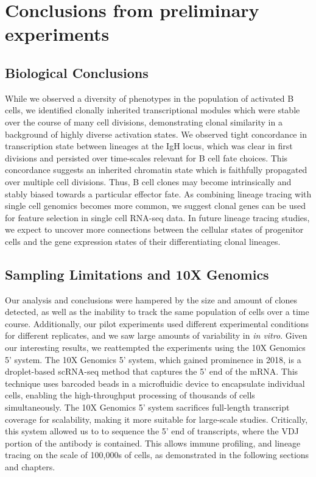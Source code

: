 \section{Conclusions from preliminary experiments}

\subsection{Biological Conclusions}
While we observed a diversity of phenotypes in the population of activated B cells, we identified clonally inherited transcriptional modules which were stable over the course of many cell divisions, demonstrating clonal similarity in a background of highly diverse activation states. We observed tight concordance in transcription state between lineages at the IgH locus, which was clear in first divisions and persisted over time-scales relevant for B cell fate choices\cite{hodgkin_modifying_2018}. This concordance suggests an inherited chromatin state which is faithfully propagated over multiple cell divisions. Thus, B cell clones may become intrinsically and stably biased towards a particular effector fate. As combining lineage tracing with single cell genomics becomes more common, we suggest clonal genes can be used for feature selection in single cell RNA-seq data. In future lineage tracing studies, we expect to uncover more connections between the cellular states of progenitor cells and the gene expression states of their differentiating clonal lineages.

\subsection{Sampling Limitations and 10X Genomics}
Our analysis and conclusions were hampered by the size and amount of clones detected, as well as the inability to track the same population of cells over a time course. Additionally, our pilot experiments used different experimental conditions for different replicates, and we saw large amounts of variability in \textit{in vitro}. Given our interesting results, we reattempted the experiments using the 10X Genomics 5' system. The 10X Genomics 5' system, which gained prominence in 2018, is a droplet-based scRNA-seq method that captures the 5' end of the mRNA. This technique uses barcoded beads in a microfluidic device to encapsulate individual cells, enabling the high-throughput processing of thousands of cells simultaneously. The 10X Genomics 5' system sacrifices full-length transcript coverage for scalability, making it more suitable for large-scale studies. Critically, this system allowed us to to sequence the 5' end of transcripts, where the VDJ portion of the antibody is contained. This allows immune profiling, and lineage tracing on the scale of 100,000s of cells, as demonstrated in the following sections and chapters. 

